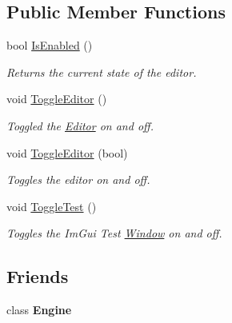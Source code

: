\subsection*{Public Member Functions}
\begin{DoxyCompactItemize}
\item 
\hypertarget{classDCEngine_1_1Systems_1_1Editor_ad37c7860a505ab36f24022ced1cbd99d}{bool \hyperlink{classDCEngine_1_1Systems_1_1Editor_ad37c7860a505ab36f24022ced1cbd99d}{Is\-Enabled} ()}\label{classDCEngine_1_1Systems_1_1Editor_ad37c7860a505ab36f24022ced1cbd99d}

\begin{DoxyCompactList}\small\item\em Returns the current state of the editor. \end{DoxyCompactList}\item 
\hypertarget{classDCEngine_1_1Systems_1_1Editor_afe3f666eb65969922feb62a0f7c09d7d}{void \hyperlink{classDCEngine_1_1Systems_1_1Editor_afe3f666eb65969922feb62a0f7c09d7d}{Toggle\-Editor} ()}\label{classDCEngine_1_1Systems_1_1Editor_afe3f666eb65969922feb62a0f7c09d7d}

\begin{DoxyCompactList}\small\item\em Toggled the \hyperlink{classDCEngine_1_1Systems_1_1Editor}{Editor} on and off. \end{DoxyCompactList}\item 
\hypertarget{classDCEngine_1_1Systems_1_1Editor_ad816896b9358dce4db8ef83d51df5c6d}{void \hyperlink{classDCEngine_1_1Systems_1_1Editor_ad816896b9358dce4db8ef83d51df5c6d}{Toggle\-Editor} (bool)}\label{classDCEngine_1_1Systems_1_1Editor_ad816896b9358dce4db8ef83d51df5c6d}

\begin{DoxyCompactList}\small\item\em Toggles the editor on and off. \end{DoxyCompactList}\item 
void \hyperlink{classDCEngine_1_1Systems_1_1Editor_a4d530af60faddb7e243bcdd21e58d973}{Toggle\-Test} ()
\begin{DoxyCompactList}\small\item\em Toggles the Im\-Gui Test \hyperlink{classDCEngine_1_1Systems_1_1Window}{Window} on and off. \end{DoxyCompactList}\end{DoxyCompactItemize}
\subsection*{Friends}
\begin{DoxyCompactItemize}
\item 
\hypertarget{classDCEngine_1_1Systems_1_1Editor_a3e1914489e4bed4f9f23cdeab34a43dc}{class {\bfseries Engine}}\label{classDCEngine_1_1Systems_1_1Editor_a3e1914489e4bed4f9f23cdeab34a43dc}

\end{DoxyCompactItemize}
